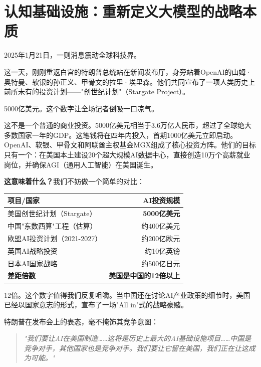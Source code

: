 \chapter{认知基础设施：重新定义大模型的战略本质}


2025年1月21日，一则消息震动全球科技界。

这一天，刚刚重返白宫的特朗普总统站在新闻发布厅，身旁站着OpenAI的山姆·奥特曼、软银的孙正义、甲骨文的拉里·埃里森。他们共同宣布了一项人类历史上前所未有的投资计划——"创世纪计划"（Stargate Project）。

5000亿美元。这个数字让全场记者倒吸一口凉气。

这不是一个普通的商业投资。5000亿美元相当于3.6万亿人民币，超过了全球绝大多数国家一年的GDP。这笔钱将在四年内投入，首期1000亿美元立即启动。OpenAI、软银、甲骨文和阿联酋主权基金MGX组成了核心投资方阵。他们的目标只有一个：在美国本土建设20个超大规模AI数据中心，直接创造10万个高薪就业岗位，并确保AGI（通用人工智能）在美国诞生。

\textbf{这意味着什么？}我们不妨做一个简单的对比：

\begin{center}
\begin{tabular}{p{6cm}r}
\toprule
\textbf{项目/国家} & \textbf{AI投资规模} \\
\midrule
美国创世纪计划（Stargate） & \textbf{5000亿美元} \\
中国"东数西算"工程（估算） & 约400亿美元 \\
欧盟AI投资计划（2021-2027） & 约200亿欧元 \\
英国AI战略投资 & 约10亿英镑 \\
日本AI国家战略 & 约500亿日元 \\
\midrule
\textbf{差距倍数} & \textbf{美国是中国的12倍以上} \\
\bottomrule
\end{tabular}
\end{center}

12倍。这个数字值得我们反复咀嚼。当中国还在讨论AI产业政策的细节时，美国已经以国家意志的形式，宣布了一场"All in"式的战略豪赌。

特朗普在发布会上的表态，毫不掩饰其竞争意图：
\begin{quote}
\textit{"我们要让AI在美国制造……这将是历史上最大的AI基础设施项目……中国是竞争对手，其他国家也是竞争对手。我们要让它留在美国，我们正在让这成为可能。"}
\end{quote}


